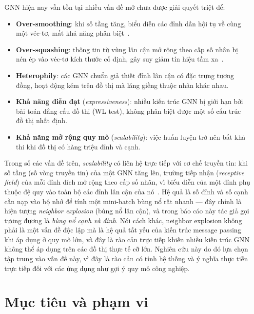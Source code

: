 GNN hiện nay vẫn tồn tại nhiều vấn đề mở chưa được giải quyết triệt để:
\begin{itemize}
    \item \textbf{Over-smoothing}: khi số tầng tăng, biểu diễn các đỉnh dần hội tụ về cùng một véc-tơ, mất khả năng phân biệt~\cite{Li2018DeeperInsights}.
    \item \textbf{Over-squashing}: thông tin từ vùng lân cận mở rộng theo cấp số nhân bị nén ép vào véc-tơ kích thước cố định, gây suy giảm tín hiệu tầm xa~\cite{Alon2021Bottleneck}.
    \item \textbf{Heterophily}: các GNN chuẩn giả thiết đỉnh lân cận có đặc trưng tương đồng, hoạt động kém trên đồ thị mà láng giềng thuộc nhãn khác nhau.
    \item \textbf{Khả năng diễn đạt} (\textit{expressiveness}): nhiều kiến trúc GNN bị giới hạn bởi bài toán đẳng cấu đồ thị (WL test), không phân biệt được một số cấu trúc đồ thị nhất định.
    \item \textbf{Khả năng mở rộng quy mô} (\textit{scalability}): việc huấn luyện trở nên bất khả thi khi đồ thị có hàng triệu đỉnh và cạnh.
\end{itemize}

Trong số các vấn đề trên, \textit{scalability} có liên hệ trực tiếp với cơ chế truyền tin: khi số tầng (số vòng truyền tin) của một GNN tăng lên, trường tiếp nhận (\textit{receptive field}) của mỗi đỉnh đích mở rộng theo cấp số nhân, vì biểu diễn của một đỉnh phụ thuộc đệ quy vào toàn bộ các đỉnh lân cận của nó~\cite{Younesian2023GRAPES, Zou2019LADIES}. Hệ quả là số đỉnh và số cạnh cần nạp vào bộ nhớ để tính một mini-batch bùng nổ rất nhanh --- đây chính là hiện tượng \textit{neighbor explosion} (bùng nổ lân cận), và trong báo cáo này tác giả gọi tương đương là \textit{bùng nổ cạnh và đỉnh}. Nói cách khác, neighbor explosion không phải là một vấn đề độc lập mà là hệ quả tất yếu của kiến trúc message passing khi áp dụng ở quy mô lớn, và đây là rào cản trực tiếp khiến nhiều kiến trúc GNN không thể áp dụng trên các đồ thị thực tế cỡ lớn. Nghiên cứu này do đó lựa chọn tập trung vào vấn đề này, vì đây là rào cản có tính hệ thống và ý nghĩa thực tiễn trực tiếp đối với các ứng dụng như gợi ý quy mô công nghiệp.

\section{Mục tiêu và phạm vi}

